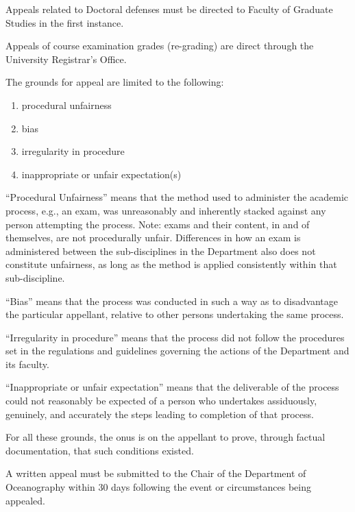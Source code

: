 \p Appeals related to Doctoral defenses must be directed to Faculty of
Graduate Studies in the first instance. 

\p Appeals of course examination grades (re-grading) are direct through
the University Registrar's Office.
 
\p The grounds for appeal are limited to the following:
\begin{enumerate} \item procedural unfairness \item bias \item irregularity in
        procedure \item inappropriate or unfair expectation(s) \end{enumerate}

``Procedural Unfairness'' means that the method used to administer the academic
process, e.g., an exam, was unreasonably and inherently stacked against any
person attempting the process.  Note: exams and their content, in and of
themselves, are not procedurally unfair.  Differences in how an exam is
administered between the sub-disciplines in the Department also does not
constitute unfairness, as long as the method is applied consistently within
that sub-discipline.  

``Bias'' means that the process was conducted in such a way as to disadvantage the
particular appellant, relative to other persons undertaking the same process.    

``Irregularity in procedure'' means that the process did not follow the
procedures set in the regulations and guidelines governing the actions of the
Department and its faculty.  

``Inappropriate or unfair expectation'' means that the deliverable of the
process could not reasonably be expected of a person who undertakes
assiduously, genuinely, and accurately the steps leading to completion of that
process.   

For all these grounds, the onus is on the appellant to prove, through factual
documentation, that such conditions existed. 

\p A written appeal must be submitted to the Chair of the Department of
Oceanography within 30 days following the event or circumstances being
appealed. 


